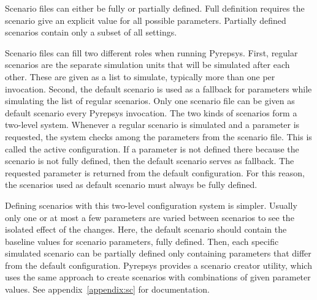\documentclass[%
    ]{\PathToTumTemplate/thesis/tum_thesis}
\begin{document}
Scenario files can either be fully or partially defined.
Full definition requires the scenario give an explicit value for all possible parameters.
Partially defined scenarios contain only a subset of all settings.

Scenario files can fill two different roles when running Pyrepsys.
First, regular scenarios are the separate simulation units that will be simulated after each other.
These are given as a list to simulate, typically more than one per invocation.
Second, the default scenario is used as a fallback for parameters while simulating the list of regular scenarios.
Only one scenario file can be given as default scenario every Pyrepsys invocation.
The two kinds of scenarios form a two-level system.
Whenever a regular scenario is simulated and a parameter is requested, the system checks among the parameters from the scenario file.
This is called the active configuration.
If a parameter is not defined there because the scenario is not fully defined, then the default scenario serves as fallback.
The requested parameter is returned from the default configuration.
For this reason, the scenarios used as default scenario must always be fully defined.

Defining scenarios with this two-level configuration system is simpler.
Usually only one or at most a few parameters are varied between scenarios to see the isolated effect of the changes.
Here, the default scenario should contain the baseline values for scenario parameters, fully defined.
Then, each specific simulated scenario can be partially defined only containing parameters that differ from the default configuration.
Pyrepsys provides a scenario creator utility, which uses the same approach to create scenarios with combinations of given parameter values.
See appendix~\ref{appendix:sc} for documentation.
\end{document}

